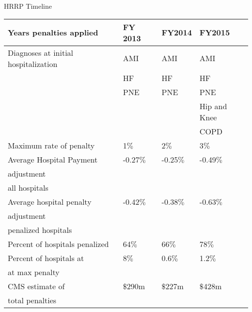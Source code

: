 \documentclass{beamer}
\begin{document}
\begin{frame}{HRRP Timeline}
\begin{table}
\centering
\footnotesize
\begin{tabular}{llll}
\hline \hline
Years penalties applied & FY 2013 & FY2014 & FY2015 \\
\hline
Diagnoses at initial hospitalization & AMI & AMI & AMI \\
						     & HF & HF & HF \\
						     & PNE & PNE & PNE \\
						     & 			&			& Hip and Knee \\
						     &			&			& COPD \\
\hline
Maximum rate of penalty		& 1$\%$ & 2$\%$ & 3$\%$ \\
Average Hospital Payment	& -0.27$\%$ & -0.25$\%$ & -0.49$\%$ \\
\hspace{0.1in} adjustment 	&&& \\
\hspace{0.1in} all hospitals	&&& \\
Average hospital penalty		& -0.42$\%$ & -0.38$\%$ & -0.63$\%$ \\
\hspace{0.1in} adjustment 	&&& \\
\hspace{0.1in} penalized hospitals	&&& \\
Percent of hospitals penalized & 64$\%$ & 66$\%$ & 78$\%$ \\
Percent of hospitals at		&8$\%$ & 0.6$\%$ & 1.2$\%$ \\
\hspace{0.1in} at max penalty	&&& \\
CMS estimate of 			& $\$$290m & $\$$227m & $\$$428m \\
\hspace{0.1in} total penalties &&&\\
\hline
\end{tabular}
\end{table}
\end{frame}
\end{document}
